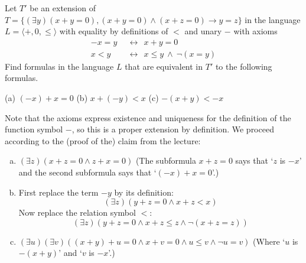 \begin{problem}

    Let $T'$ be an extension of $T=\{(\exists y)(x+y=0),(x+y=0)\wedge (x+z=0)\rightarrow y=z\}$ in the language $L=\langle +,0,\le\rangle$ with equality by definitions of $<$ and unary $-$ with axioms
    \begin{align*}
        -x=y\ \ &\leftrightarrow\ \ x+y=0\\
        x<y\ \ &\leftrightarrow\ \ x\le y\ \wedge\ \neg(x=y)
    \end{align*}
    Find formulas in the language $L$ that are equivalent in $T'$ to the following formulas.
        
    (a) $(-x)+x=0$ \hfill (b) $x+(-y)<x$ \hfill (c) $-(x+y)<-x$\hfill{}

    \begin{solution}

        Note that the axioms express existence and uniqueness for the definition of the function symbol $-$, so this is a proper extension by definition. We proceed according to the (proof of the) claim from the lecture:
        \begin{enumerate}[(a)]
            \item $(\exists z)(x+z=0\land z+x=0)$ (The subformula $x+z=0$ says that `$z$ is $-x$' and the second subformula says that `$(-x)+x=0$'.)
            \item First replace the term $-y$ by its definition:
            $$
            (\exists z)(y+z=0\land x+z<x)
            $$
            Now replace the relation symbol $<$:
            $$
            (\exists z)(y+z=0\land x+z\leq z\land\neg(x+z=z))
            $$
            \item $(\exists u)(\exists v)((x+y)+u=0\land x+v=0\land u\leq v\land \neg u=v)$ (Where `$u$ is $-(x+y)$' and `$v$ is $-x$'.)
        \end{enumerate}
                    
    \end{solution}
    
\end{problem}



